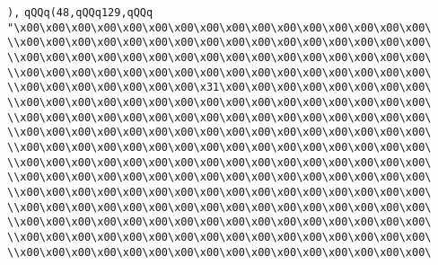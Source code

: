 \verb|),|\newline
\verb|qQQq(48,qQQq129,qQQq|\newline
\verb|"\x00\x00\x00\x00\x00\x00\x00\x00\x00\x00\x00\x00\x00\x00\x00\x00\|\newline
\verb|\\x00\x00\x00\x00\x00\x00\x00\x00\x00\x00\x00\x00\x00\x00\x00\x00\|\newline
\verb|\\x00\x00\x00\x00\x00\x00\x00\x00\x00\x00\x00\x00\x00\x00\x00\x00\|\newline
\verb|\\x00\x00\x00\x00\x00\x00\x00\x00\x00\x00\x00\x00\x00\x00\x00\x00\|\newline
\verb|\\x00\x00\x00\x00\x00\x00\x00\x31\x00\x00\x00\x00\x00\x00\x00\x00\|\newline
\verb|\\x00\x00\x00\x00\x00\x00\x00\x00\x00\x00\x00\x00\x00\x00\x00\x00\|\newline
\verb|\\x00\x00\x00\x00\x00\x00\x00\x00\x00\x00\x00\x00\x00\x00\x00\x00\|\newline
\verb|\\x00\x00\x00\x00\x00\x00\x00\x00\x00\x00\x00\x00\x00\x00\x00\x00\|\newline
\verb|\\x00\x00\x00\x00\x00\x00\x00\x00\x00\x00\x00\x00\x00\x00\x00\x00\|\newline
\verb|\\x00\x00\x00\x00\x00\x00\x00\x00\x00\x00\x00\x00\x00\x00\x00\x00\|\newline
\verb|\\x00\x00\x00\x00\x00\x00\x00\x00\x00\x00\x00\x00\x00\x00\x00\x00\|\newline
\verb|\\x00\x00\x00\x00\x00\x00\x00\x00\x00\x00\x00\x00\x00\x00\x00\x00\|\newline
\verb|\\x00\x00\x00\x00\x00\x00\x00\x00\x00\x00\x00\x00\x00\x00\x00\x00\|\newline
\verb|\\x00\x00\x00\x00\x00\x00\x00\x00\x00\x00\x00\x00\x00\x00\x00\x00\|\newline
\verb|\\x00\x00\x00\x00\x00\x00\x00\x00\x00\x00\x00\x00\x00\x00\x00\x00\|\newline
\verb|\\x00\x00\x00\x00\x00\x00\x00\x00\x00\x00\x00\x00\x00\x00\x00\x00\|\newline
